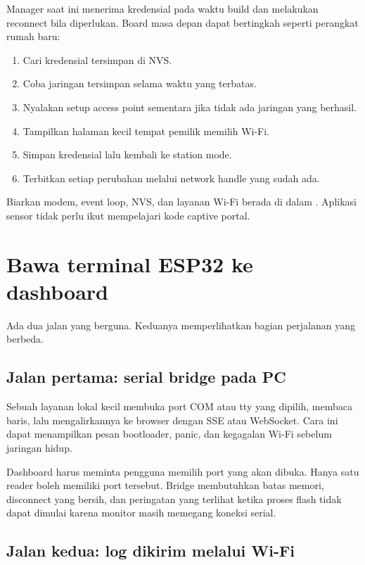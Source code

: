 Manager saat ini menerima kredensial pada waktu build dan melakukan reconnect bila diperlukan. Board masa depan dapat bertingkah seperti perangkat rumah baru:

\begin{enumerate}
  \item Cari kredensial tersimpan di NVS.
  \item Coba jaringan tersimpan selama waktu yang terbatas.
  \item Nyalakan setup access point sementara jika tidak ada jaringan yang berhasil.
  \item Tampilkan halaman kecil tempat pemilik memilih Wi-Fi.
  \item Simpan kredensial lalu kembali ke station mode.
  \item Terbitkan setiap perubahan melalui network handle yang sudah ada.
\end{enumerate}

Biarkan modem, event loop, NVS, dan layanan Wi-Fi berada di dalam . Aplikasi sensor tidak perlu ikut mempelajari kode captive portal.

\section{Bawa terminal ESP32 ke dashboard}

Ada dua jalan yang berguna. Keduanya memperlihatkan bagian perjalanan yang berbeda.

\subsection{Jalan pertama: serial bridge pada PC}

Sebuah layanan lokal kecil membuka port COM atau tty yang dipilih, membaca baris, lalu mengalirkannya ke browser dengan SSE atau WebSocket. Cara ini dapat menampilkan pesan bootloader, panic, dan kegagalan Wi-Fi sebelum jaringan hidup.

Dashboard harus meminta pengguna memilih port yang akan dibuka. Hanya satu reader boleh memiliki port tersebut. Bridge membutuhkan batas memori, disconnect yang bersih, dan peringatan yang terlihat ketika proses flash tidak dapat dimulai karena monitor masih memegang koneksi serial.

\subsection{Jalan kedua: log dikirim melalui Wi-Fi}

